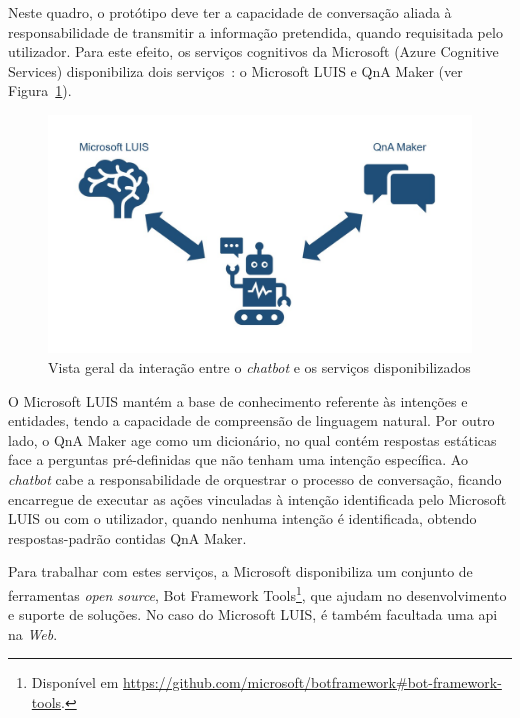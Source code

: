 Neste quadro, o protótipo deve ter a capacidade de conversação aliada à responsabilidade de transmitir a informação pretendida, quando requisitada pelo utilizador. Para este efeito, os serviços cognitivos da Microsoft (Azure Cognitive Services) disponibiliza dois serviços~\parencite{microsoft_luis_use_nl_processing_service}: o Microsoft LUIS e QnA Maker (ver Figura~\ref{fig:prototype_overview}).
%
\begin{figure}
    \centering
    \includegraphics[width=.8\textwidth]{ch05/assets/prototype-overview.jpg}
    \caption{Vista geral da interação entre o \textit{chatbot} e os serviços disponibilizados}
    \label{fig:prototype_overview}
\end{figure}

O Microsoft LUIS mantém a base de conhecimento referente às intenções e entidades, tendo a capacidade de compreensão de linguagem natural. Por outro lado, o QnA Maker age como um dicionário, no qual contém respostas estáticas face a perguntas pré-definidas que não tenham uma intenção específica. Ao \textit{chatbot} cabe a responsabilidade de orquestrar o processo de conversação, ficando encarregue de executar as ações vinculadas à intenção identificada pelo Microsoft LUIS ou  com o utilizador, quando nenhuma intenção é identificada, obtendo respostas-padrão contidas QnA Maker.

Para trabalhar com estes serviços, a Microsoft disponibiliza um conjunto de ferramentas \textit{open source}, Bot Framework Tools\footnote{Disponível em \url{https://github.com/microsoft/botframework\#bot-framework-tools}.}, que ajudam no desenvolvimento e suporte de soluções. No caso do Microsoft LUIS, é também facultada uma \gls{api} na \textit{Web}.

